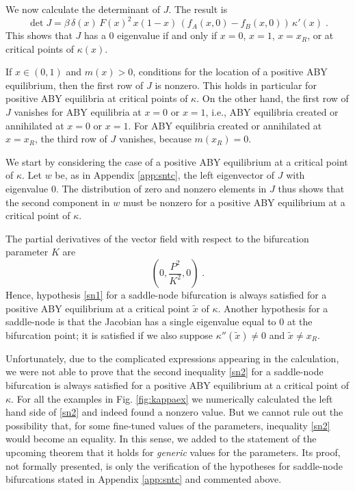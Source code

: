 \documentclass[12pt]{article}
\theoremstyle{definition}
\begin{document}
We now calculate the determinant of $J$. The result is
\begin{equation}  \label{detJ}
	\det J=\beta \, \delta(x)\, F(x)^2\, x(1-x)\,\left(f_A(x,0)-f_B(x,0)\right)  \, \kappa'(x)\;.
\end{equation}
This shows that $J$ has a 0 eigenvalue if and only if $x=0$, $x=1$, $x=x_R$, or at critical points of $\kappa(x)$. 

If $x \in (0,1)$ and $m(x)>0$, conditions for the location of a positive ABY equilibrium, then the first row of $J$ is nonzero. This holds in particular for positive ABY equilibria at critical points of $\kappa$. On the other hand, the first row of $J$ vanishes for ABY equilibria at $x=0$ or $x=1$, i.e., ABY equilibria created or annihilated at $x=0$ or $x=1$. For ABY equilibria created or annihilated at $x=x_R$, the third row of $J$ vanishes, because $m(x_R)=0$.

We start by considering the case of a positive ABY equilibrium at a critical point of $\kappa$. Let $w$ be, as in Appendix \ref{app:sntc}, the left eigenvector of $J$ with eigenvalue $0$. The distribution of zero and nonzero elements in $J$ thus shows that the second component in $w$ must be nonzero for a positive ABY equilibrium at a critical point of $\kappa$.

The partial derivatives of the vector field with respect to the bifurcation parameter $K$ are
\begin{equation}  \label{Kder}
	(0,\frac{P^2}{K^2},0)\;.
\end{equation}
Hence, hypothesis \eqref{sn1} for a saddle-node bifurcation is always satisfied for a positive ABY equilibrium at a critical point $\tilde{x}$ of $\kappa$. Another hypothesis for a saddle-node is that the Jacobian has a single eigenvalue equal to 0 at the bifurcation point; it is satisfied if we also suppose $\kappa''(\tilde{x}) \neq 0$ and $\tilde{x} \neq x_R$.

Unfortunately, due to the complicated expressions appearing in the calculation, we were not able to prove that the second inequality \eqref{sn2} for a saddle-node bifurcation is always satisfied for a positive ABY equilibrium at a critical point of $\kappa$. For all the examples in Fig. \ref{fig:kappaex} we numerically calculated the left hand side of \eqref{sn2} and indeed found a nonzero value. But we cannot rule out the possibility that, for some fine-tuned values of the parameters, inequality \eqref{sn2} would become an equality. In this sense, we added to the statement of the upcoming theorem that it holds for \emph{generic} values for the parameters. Its proof, not formally presented, is only the verification of the hypotheses for saddle-node bifurcations stated in Appendix \ref{app:sntc} and commented above.
\end{document}
